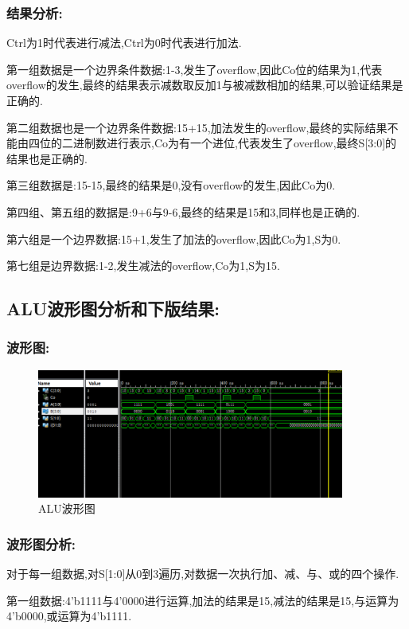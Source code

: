 \documentclass{article}
\begin{document}
\subsubsection*{结果分析:}
Ctrl为1时代表进行减法,Ctrl为0时代表进行加法.

第一组数据是一个边界条件数据:1-3,发生了overflow,因此Co位的结果为1,代表overflow的发生,最终的结果表示减数取反加1与被减数相加的结果,可以验证结果是正确的.

第二组数据也是一个边界条件数据:15+15,加法发生的overflow,最终的实际结果不能由四位的二进制数进行表示,Co为有一个进位,代表发生了overflow,最终S[3:0]的结果也是正确的.

第三组数据是:15-15,最终的结果是0,没有overflow的发生,因此Co为0.

第四组、第五组的数据是:9+6与9-6,最终的结果是15和3,同样也是正确的.

第六组是一个边界数据:15+1,发生了加法的overflow,因此Co为1,S为0.

第七组是边界数据:1-2,发生减法的overflow,Co为1,S为15.


\subsection*{ALU波形图分析和下版结果:}
   
\subsubsection*{波形图:}
    \begin{figure}[H]
    \centering
    \includegraphics[width=0.9\textwidth]{lab8/9.png}
    \caption{\label{Lab8}ALU波形图}
    \end{figure}
\subsubsection*{波形图分析:}
对于每一组数据,对S[1:0]从0到3遍历,对数据一次执行加、减、与、或的四个操作.

第一组数据:4'b1111与4'0000进行运算,加法的结果是15,减法的结果是15,与运算为4'b0000,或运算为4'b1111.
\end{document}
